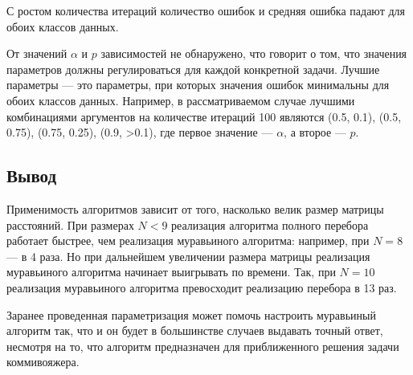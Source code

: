 С ростом количества итераций количество ошибок и средняя ошибка падают для обоих классов данных. 

От значений $\alpha$ и $p$ зависимостей не обнаружено, что говорит о том, что значения параметров должны регулироваться для каждой конкретной задачи. 
Лучшие параметры --- это параметры, при которых значения ошибок минимальны для обоих классов данных. 
Например, в рассматриваемом случае лучшими комбинациями аргументов на количестве итераций 100 являются (0.5, 0.1), (0.5, 0.75), (0.75, 0.25), (0.9, >0.1), где первое значение --- $\alpha$, а второе --- $p$.

\vspace{\baselineskip}
\subsection*{Вывод}
\vspace{\baselineskip}

Применимость алгоритмов зависит от того, насколько велик размер матрицы расстояний.
При размерах $N < 9$ реализация алгоритма полного перебора работает быстрее, чем реализация муравьиного алгоритма: например, при $N = 8$ --- в 4 раза.
Но при дальнейшем увеличении размера матрицы реализация муравьиного алгоритма начинает выигрывать по времени. Так, при $N = 10$ реализация муравьиного алгоритма превосходит реализацию перебора в 13 раз.

Заранее проведенная параметризация может помочь настроить муравьиный алгоритм так, что и он будет в большинстве случаев выдавать точный ответ, несмотря на то, что алгоритм предназначен для приближенного решения задачи коммивояжера.
